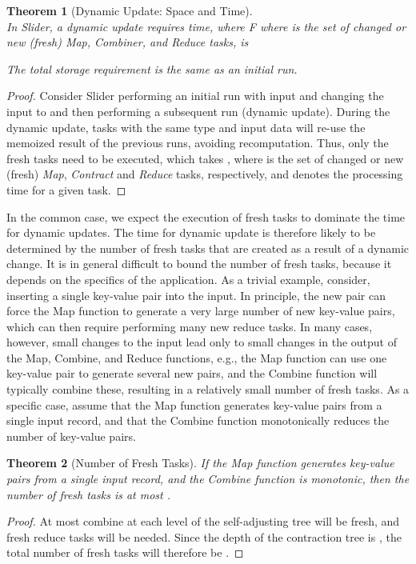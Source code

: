 \documentclass{article}
\newcommand{\projecttitle}{Slider\xspace}
\newtheorem{theorem}{Theorem}
\begin{document}
\begin{theorem}[Dynamic Update: Space and Time]
~\\
In \projecttitle, a dynamic update requires time, where F where
 is the set of changed or new (fresh) \emph{Map}, \emph{Combiner}, and
\emph{Reduce} tasks, is 

The total storage requirement is the same as an initial
run.
\end{theorem}
\begin{proof}
Consider \projecttitle performing an initial run with input  and
changing the input to  and then performing a subsequent run
(dynamic update). During the dynamic update, tasks with the same type
and input data will re-use the memoized result of the previous runs,
avoiding recomputation.  Thus, only the fresh tasks need to be
executed, which takes , where
 is the set of changed or new (fresh) \emph{Map}, \emph{Contract}
and \emph{Reduce} tasks, respectively, and  denotes the
processing time for a given task.
\end{proof}



In the common case, we expect the execution of fresh tasks to
dominate the time for dynamic updates. The time for dynamic update is therefore
likely to be determined by the number of fresh tasks that are created
as a result of a dynamic change.  It is in general difficult to bound
the number of fresh tasks, because it depends on the specifics of the
application.  As a trivial example, consider, inserting a single
key-value pair into the input.  In principle, the new pair can force the
Map function to generate a very large number of new key-value pairs,
which can then require performing many new reduce tasks.  In many
cases, however, small changes to the input lead only to small changes in
the output of the Map, Combine, and Reduce functions, e.g., the Map
function can use one key-value pair to generate several new pairs, and
the Combine function will typically combine these, resulting in a
relatively small number of fresh tasks.
As a specific case, assume that the Map function generates 
key-value pairs from a single input record, and that the Combine
function monotonically reduces the number of key-value pairs.  



\begin{theorem}[Number of Fresh Tasks]
\label{them:bound-fresh}
If the Map function generates  key-value pairs from a single input
record, and  the Combine function is monotonic, then the number of
fresh tasks is at most .
\end{theorem}
\begin{proof}
At most  combine at each level of the self-adjusting
tree will be fresh, and  fresh reduce tasks will be needed. Since
the depth of the contraction tree is , the total number
of fresh tasks will therefore be .
\end{proof}
\end{document}

